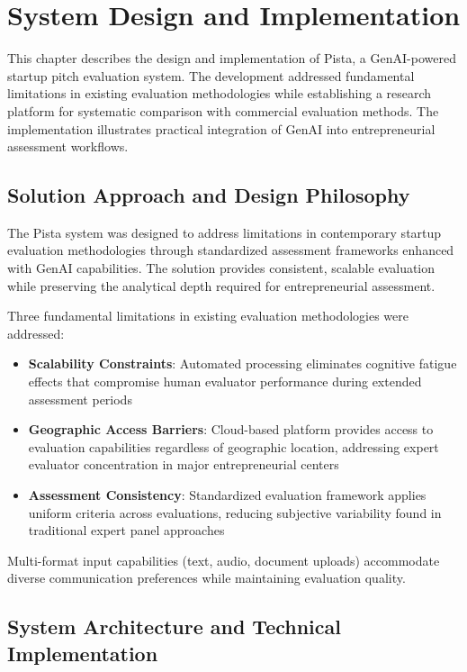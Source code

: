\chapter{System Design and Implementation} \label{ch:problem-solution}

This chapter describes the design and implementation of Pista, a GenAI-powered startup pitch evaluation system. The development addressed fundamental limitations in existing evaluation methodologies while establishing a research platform for systematic comparison with commercial evaluation methods. The implementation illustrates practical integration of GenAI into entrepreneurial assessment workflows.

\section{Solution Approach and Design Philosophy} \label{sec:solution-approach}

The Pista system was designed to address limitations in contemporary startup evaluation methodologies through standardized assessment frameworks enhanced with GenAI capabilities. The solution provides consistent, scalable evaluation while preserving the analytical depth required for entrepreneurial assessment.

Three fundamental limitations in existing evaluation methodologies were addressed:

\begin{itemize}
  \item \textbf{Scalability Constraints}: Automated processing eliminates cognitive fatigue effects that compromise human evaluator performance during extended assessment periods \cite{Hirshleifer2019}
  \item \textbf{Geographic Access Barriers}: Cloud-based platform provides access to evaluation capabilities regardless of geographic location, addressing expert evaluator concentration in major entrepreneurial centers \cite{Colombo2019}
  \item \textbf{Assessment Consistency}: Standardized evaluation framework applies uniform criteria across evaluations, reducing subjective variability found in traditional expert panel approaches \cite{Gius2024}
\end{itemize}

Multi-format input capabilities (text, audio, document uploads) accommodate diverse communication preferences while maintaining evaluation quality.


\section{System Architecture and Technical Implementation} \label{sec:system-design}

